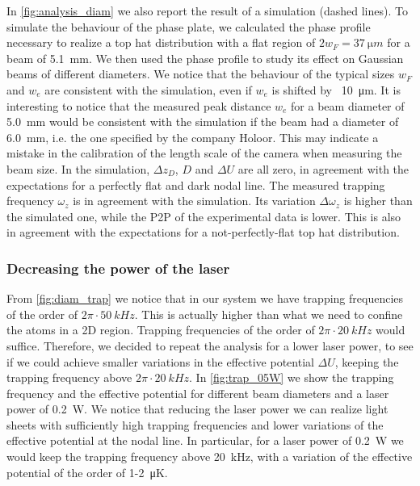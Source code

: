 In \cref{fig:analysis_diam} we also report the result of a simulation (dashed lines). To simulate the behaviour of the phase plate, we calculated the phase profile necessary to realize a top hat distribution with a flat region of $2w_F = \SI{37}{\micro m}$ for a beam of \SI{5.1}{mm}. We then used the phase profile to study its effect on Gaussian beams of different diameters. We notice that the behaviour of the typical sizes $w_F$ and $w_e$ are consistent with the simulation, even if $w_e$ is shifted by ~\SI{10}{\micro m}. It is interesting to notice that the measured peak distance $w_e$ for a beam diameter of \SI{5.0}{mm} would be consistent with the simulation if the beam had a diameter of \SI{6.0}{mm}, i.e. the one specified by the company Holoor. This may indicate a mistake in the calibration of the length scale of the camera when measuring the beam size. In the simulation, $\Delta z_D$, $D$ and $\Delta U$ are all zero, in agreement with the expectations for a perfectly flat and dark nodal line. The measured trapping frequency $\omega_z$ is in agreement with the simulation. Its variation $\Delta \omega_z$ is higher than the simulated one, while the P2P of the experimental data is lower. This is also in agreement with the expectations for a not-perfectly-flat top hat distribution.



\subsubsection{Decreasing the power of the laser}
From \cref{fig:diam_trap} we notice that in our system we have trapping frequencies of the order of $2\pi\cdot\SI{50}{kHz}$. This is actually higher than what we need to confine the atoms in a 2D region. Trapping frequencies of the order of $2\pi\cdot\SI{20}{kHz}$ would suffice. Therefore, we decided to repeat the analysis for a lower laser power, to see if we could achieve smaller variations in the effective potential $\Delta U$, keeping the trapping frequency above $2\pi\cdot\SI{20}{kHz}$. In \cref{fig:trap_05W} we show the trapping frequency and the effective potential for different beam diameters and a laser power of \SI{0.2}{W}.
We notice that reducing the laser power we can realize light sheets with sufficiently high trapping frequencies and lower variations of the effective potential at the nodal line. In particular, for a laser power of \SI{0.2}{W} we would keep the trapping frequency above \SI{20}{\kilo Hz}, with a variation of the effective potential of the order of 1-\SI{2}{\micro K}.

